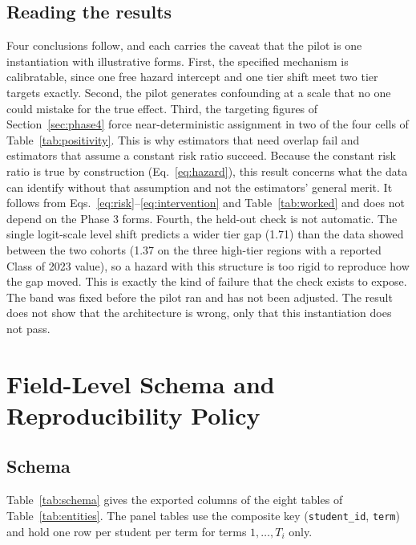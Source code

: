 \documentclass[11pt]{article}
\begin{document}
\subsection{Reading the results}

\hspace*{\parindent}Four conclusions follow, and each carries the caveat that the pilot is one instantiation with illustrative forms. First, the specified mechanism is calibratable, since one free hazard intercept and one tier shift meet two tier targets exactly. Second, the pilot generates confounding at a scale that no one could mistake for the true effect. Third, the targeting figures of Section~\ref{sec:phase4} force near-deterministic assignment in two of the four cells of Table~\ref{tab:positivity}. This is why estimators that need overlap fail and estimators that assume a constant risk ratio succeed. Because the constant risk ratio is true by construction (Eq.~\ref{eq:hazard}), this result concerns what the data can identify without that assumption and not the estimators' general merit. It follows from Eqs.~\ref{eq:risk}--\ref{eq:intervention} and Table~\ref{tab:worked} and does not depend on the Phase 3 forms. Fourth, the held-out check is not automatic. The single logit-scale level shift predicts a wider tier gap (1.71) than the data showed between the two cohorts (1.37 on the three high-tier regions with a reported Class of 2023 value), so a hazard with this structure is too rigid to reproduce how the gap moved. This is exactly the kind of failure that the check exists to expose. The band was fixed before the pilot ran and has not been adjusted. The result does not show that the architecture is wrong, only that this instantiation does not pass.

\FloatBarrier
\section{Field-Level Schema and Reproducibility Policy}
\label{sec:appendixB}

\subsection{Schema}

\hspace*{\parindent}Table~\ref{tab:schema} gives the exported columns of the eight tables of Table~\ref{tab:entities}. The panel tables use the composite key (\texttt{student\_id}, \texttt{term}) and hold one row per student per term for terms $1,\ldots,T_i$ only.
\end{document}
